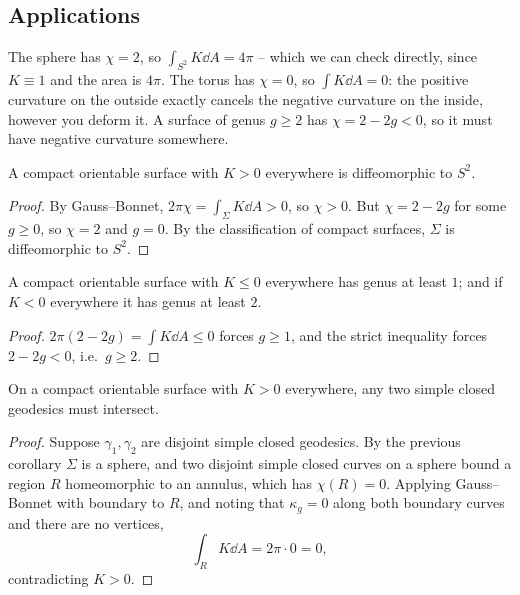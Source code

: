\documentclass[a4paper]{scrartcl}
\begin{document}
\subsection{Applications}

\begin{example}
    The sphere has $\chi = 2$, so $\int_{S^2}K \dd A = 4\pi$ -- which we can check directly, since $K \equiv 1$ and the area is $4\pi$. The torus has $\chi = 0$, so $\int K \dd A = 0$: the positive curvature on the outside exactly cancels the negative curvature on the inside, however you deform it. A surface of genus $g \geq 2$ has $\chi = 2-2g < 0$, so it must have negative curvature somewhere.
\end{example}

\begin{corollary}
    A compact orientable surface with $K > 0$ everywhere is diffeomorphic to $S^2$.
\end{corollary}
\begin{proof}
    By Gauss--Bonnet, $2\pi\chi = \int_\Sigma K\dd A > 0$, so $\chi > 0$. But $\chi = 2 - 2g$ for some $g \geq 0$, so $\chi = 2$ and $g = 0$. By the classification of compact surfaces, $\Sigma$ is diffeomorphic to $S^2$.
\end{proof}

\begin{corollary}
    A compact orientable surface with $K \leq 0$ everywhere has genus at least $1$; and if $K < 0$ everywhere it has genus at least $2$.
\end{corollary}
\begin{proof}
    $2\pi(2-2g) = \int K \dd A \leq 0$ forces $g \geq 1$, and the strict inequality forces $2-2g < 0$, i.e.\ $g \geq 2$.
\end{proof}

\begin{proposition}
    On a compact orientable surface with $K > 0$ everywhere, any two simple closed geodesics must intersect.
\end{proposition}
\begin{proof}
    Suppose $\gamma_1, \gamma_2$ are disjoint simple closed geodesics. By the previous corollary $\Sigma$ is a sphere, and two disjoint simple closed curves on a sphere bound a region $R$ homeomorphic to an annulus, which has $\chi(R) = 0$. Applying Gauss--Bonnet with boundary to $R$, and noting that $\kappa_g = 0$ along both boundary curves and there are no vertices,
    $$
    \int_R K \dd A = 2\pi\cdot 0 = 0,
    $$
    contradicting $K > 0$.
\end{proof}
\end{document}
